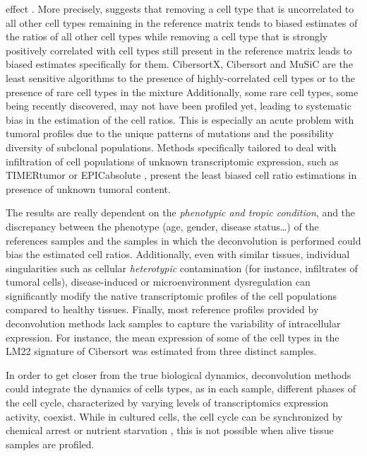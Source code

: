 \begin{enumerate}
{  effect} \autocite{shen-orr_gaujoux13}. More precisely, \autocite{fa_etal20} suggests that removing a cell type that is uncorrelated
  to all other cell types remaining in the reference matrix tends to
  biased estimates of the ratios of all other cell types while removing
  a cell type that is strongly positively correlated with cell types
  still present in the reference matrix leads to biased estimates
  specifically for them. CibersortX, Cibersort and MuSiC are the least
  sensitive algorithms to the presence of highly-correlated cell types
  or to the presence of rare cell types in the
  mixture\autocite{jin_liu21}
  Additionally, some rare cell types, some being recently discovered,
  may not have been profiled yet, leading to systematic bias in the
  estimation of the cell ratios. This is especially an acute problem
  with tumoral profiles due to the unique patterns of mutations and the
  possibility diversity of subclonal populations. Methods specifically
  tailored to deal with infiltration of cell populations of unknown
  transcriptomic expression, such as TIMERtumor
  \autocite{li_etal16} or EPICabsolute
  \autocite{racle_etal17}, present the
  least biased cell ratio estimations in presence of unknown tumoral
  content.
\end{enumerate}

The results are really dependent on the \emph{phenotypic and tropic
condition}, and the discrepancy between the phenotype (age, gender,
disease status\ldots) of the references samples and the samples in which
the deconvolution is performed could bias the estimated cell ratios.
Additionally, even with similar tissues, individual singularities such
as cellular \emph{heterotypic} contamination (for instance, infiltrates
of tumoral cells), disease-induced or microenvironment dysregulation can
significantly modify the native transcriptomic profiles of the cell
populations compared to healthy tissues. Finally, most reference
profiles provided by deconvolution methods lack samples to capture the
variability of intracellular expression. For instance, the mean
expression of some of the cell types in the LM22 signature of Cibersort
\autocite{newman_etal15} was
estimated from three distinct samples.

In order to get closer from the true biological dynamics, deconvolution
methods could integrate the dynamics of cells types, as in each sample,
different phases of the cell cycle, characterized by varying levels of
transcriptomics expression activity, coexist. While in cultured cells,
the cell cycle can be synchronized by chemical arrest or nutrient
starvation \autocite{bar-joseph_etal08}, this is not possible when alive tissue samples are profiled.


